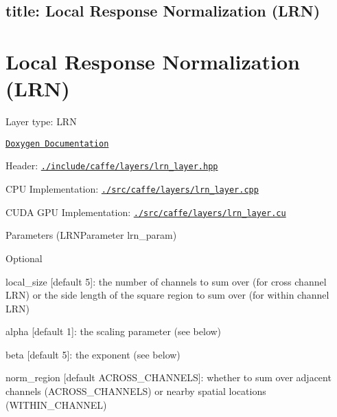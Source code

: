

 \subsection*{title\+: Local Response Normalization (L\+RN) }

\section*{Local Response Normalization (L\+RN)}


\begin{DoxyItemize}
\item Layer type\+: {\ttfamily L\+RN}
\item \href{http://caffe.berkeleyvision.org/doxygen/classcaffe_1_1LRNLayer.html}{\tt Doxygen Documentation}
\item Header\+: \href{https://github.com/BVLC/caffe/blob/master/include/caffe/layers/lrn_layer.hpp}{\tt {\ttfamily ./include/caffe/layers/lrn\+\_\+layer.hpp}}
\item C\+PU Implementation\+: \href{https://github.com/BVLC/caffe/blob/master/src/caffe/layers/lrn_layer.cpp}{\tt {\ttfamily ./src/caffe/layers/lrn\+\_\+layer.cpp}}
\item C\+U\+DA G\+PU Implementation\+: \href{https://github.com/BVLC/caffe/blob/master/src/caffe/layers/lrn_layer.cu}{\tt {\ttfamily ./src/caffe/layers/lrn\+\_\+layer.cu}}
\item Parameters ({\ttfamily L\+R\+N\+Parameter lrn\+\_\+param})
\begin{DoxyItemize}
\item Optional
\begin{DoxyItemize}
\item {\ttfamily local\+\_\+size} \mbox{[}default 5\mbox{]}\+: the number of channels to sum over (for cross channel L\+RN) or the side length of the square region to sum over (for within channel L\+RN)
\item {\ttfamily alpha} \mbox{[}default 1\mbox{]}\+: the scaling parameter (see below)
\item {\ttfamily beta} \mbox{[}default 5\mbox{]}\+: the exponent (see below)
\item {\ttfamily norm\+\_\+region} \mbox{[}default {\ttfamily A\+C\+R\+O\+S\+S\+\_\+\+C\+H\+A\+N\+N\+E\+LS}\mbox{]}\+: whether to sum over adjacent channels ({\ttfamily A\+C\+R\+O\+S\+S\+\_\+\+C\+H\+A\+N\+N\+E\+LS}) or nearby spatial locations ({\ttfamily W\+I\+T\+H\+I\+N\+\_\+\+C\+H\+A\+N\+N\+EL})
\end{DoxyItemize}
\end{DoxyItemize}
\end{DoxyItemize}

